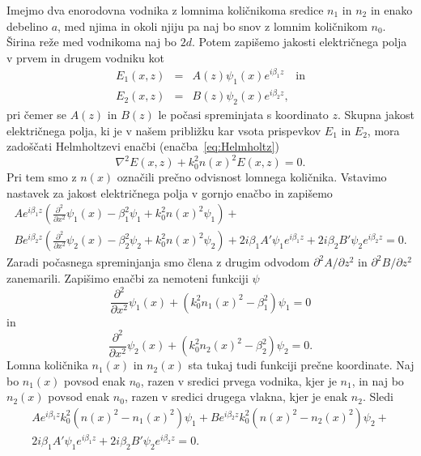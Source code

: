 Imejmo dva enorodovna vodnika z lomnima količnikoma sredice $n_1$ in $n_2$ in enako 
debelino $a$, med njima in okoli njiju pa naj bo snov z lomnim količnikom $n_0$. Širina 
reže med vodnikoma naj bo $2d$.
Potem zapišemo jakosti električnega polja v prvem in drugem vodniku kot
\begin{eqnarray}
E_1(x,z) &=& A(z) \psi_1(x) e^{i \beta_1 z} \quad \mathrm{in}\\
E_2(x,z) &=& B(z) \psi_2(x) e^{i \beta_2 z},
\label{eq:10_ampl}
\end{eqnarray}
pri čemer se $A(z)$ in $B(z)$ le počasi spreminjata s koordinato $z$. Skupna jakost električnega
polja, ki je v našem približku kar vsota prispevkov $E_1$ in $E_2$, 
mora zadoščati Helmholtzevi enačbi
(enačba~\ref{eq:Helmholtz})
\begin{equation}
\nabla^{2}E(x,z)+k_0^{2}n(x)^2 E(x,z) =0.
\end{equation}
Pri tem smo z $n(x)$ označili prečno odvisnost lomnega količnika.
Vstavimo nastavek za jakost električnega polja v gornjo enačbo in zapišemo
\begin{multline}
A e^{i \beta_1 z}\left(\frac{\partial^2}{\partial x^2}\psi_1(x) - \beta_1^2\psi_1 + k_0^2
n(x)^2 \psi_1 \right)
+ \\
B e^{i \beta_2 z}\left(\frac{\partial^2}{\partial x^2}\psi_2(x) - \beta_2^2\psi_2 + k_0^2
n(x)^2 \psi_2 \right)+ 2 i \beta_1 A' \psi_1 e^{i \beta_1 z}+
2 i \beta_2 B' \psi_2 e^{i \beta_2 z} = 0.
\end{multline}
Zaradi počasnega spreminjanja  smo člena z drugim odvodom $\partial^2 A/\partial z^2$ in $\partial^2 B/\partial z^2$ zanemarili. Zapišimo enačbi za nemoteni funkciji $\psi$
\begin{equation}
\frac{\partial^2}{\partial x^2}\psi_1(x) + \left(k_0^2n_1(x)^2-\beta_1^2\right) \psi_1 =0
\end{equation}
in
\begin{equation}
 \frac{\partial^2}{\partial x^2}\psi_2(x) + \left(k_0^2n_2(x)^2-\beta_2^2\right) \psi_2 =0.
\end{equation}
Lomna količnika $n_1(x)$ in $n_2(x)$ sta tukaj tudi funkciji prečne koordinate. Naj bo $n_1(x)$  
povsod enak $n_0$, razen v sredici prvega vodnika, kjer je $n_1$, in naj bo 
$n_2(x)$ povsod enak $n_0$, razen v sredici drugega vlakna, kjer je enak $n_2$. Sledi
\begin{multline}
A e^{i \beta_1 z}k_0^2\left(n(x)^2 -n_1(x)^2\right)\psi_1 
+ 
B e^{i \beta_2 z}k_0^2\left(n(x)^2 -n_2(x)^2\right)\psi_2 + \\2 i \beta_1 A' \psi_1 e^{i \beta_1 z}+
2 i \beta_2 B' \psi_2 e^{i \beta_2 z} = 0.
\end{multline}
